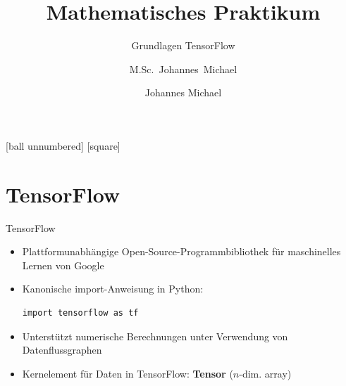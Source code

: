 \documentclass[utf8, smaller, c]{beamer}
\begin{document}
	\author{M.Sc.~Johannes~Michael}
	\date[05.~November~2021]{Johannes Michael}
	\title{Mathematisches Praktikum}
	\subtitle{Grundlagen TensorFlow}

	\frame{\maketitle}


    [ball unnumbered]
    [square]
 	\frame{\tableofcontents}

\section{TensorFlow}
\begin{frame}[fragile]{TensorFlow}
	\begin{itemize}
		\item Plattformunabhängige Open-Source-Programmbibliothek für maschinelles Lernen von Google
			\item Kanonische import-Anweisung in Python:
	\begin{lstlisting}
import tensorflow as tf
	\end{lstlisting}
        \item Unterstützt numerische Berechnungen unter Verwendung von Datenflussgraphen	
	    \item Kernelement für Daten in TensorFlow: \textbf{Tensor} ($n$-dim. array)
	\end{itemize}
\end{frame}

\end{document}
